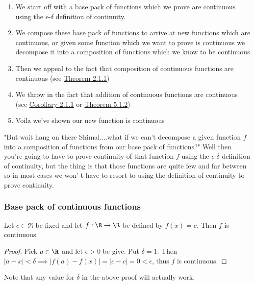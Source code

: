 	 
	 \begin{enumerate}
	 	\item We start off with a base pack of functions which we prove are continuous using the  $\epsilon$-$\delta$ definition of continuity. 
	 	\item We compose these base pack of functions to arrive at new functions which are continuous, or given some function which we want to prove is continuous we decompose it into a composition of functions which we know to be continuous
	 	\item Then we appeal to the fact that composition of continuous functions are continuous (see \hyperlink{composition-continuity}{Theorem 2.1.1})
	 	\item We throw in the fact that addition of continuous functions are continuous (see \hyperlink{operations-cont}{Corollary 2.1.1} or \hyperlink{multi-operations-cont}{Theorem 5.1.2})
	 	\item Voila we've shown our new function is continuous
	 \end{enumerate}
	 
	 "But wait hang on there Shimal....what if we can't decompose a given function $f$ into a composition of functions from our base pack of functions?" Well then you're going to have to prove continuity of that function $f$ using the $\epsilon$-$\delta$ definition of continuity, but the thing is that those functions are quite few and far between so in most cases we won' t have to resort to using the definition of continuity to prove continuity.
	 
	 \subsubsection{Base pack of continuous functions}
	 
	 \begin{result}
	 	Let $c \in \Re$ be fixed and let $f : \R \to \R$ be defined by $f(x) = c$. Then $f$ is continuous.
	 \end{result}
	 
	 \begin{proof}
	 	Pick $a \in \R$ and let $\epsilon > 0$ be give. Put $\delta = 1$. Then $|a- x| < \delta \implies |f(a) - f(x)| = |c-c| = 0 < \epsilon$, thus $f$ is continuous.
	 \end{proof}
	 
	 
	 \begin{remark}
	 	Note that any value for $\delta$ in the above proof will actually work.
	 \end{remark}
	 

